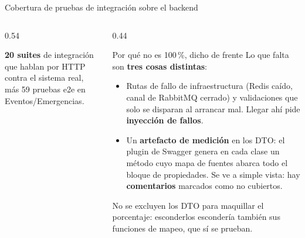 \documentclass[aspectratio=169,10pt,xcolor={table}]{beamer}
\begin{document}
\begin{frame}{Cobertura de pruebas de integración sobre el backend}
  \begin{columns}[T]
    \begin{column}{0.54\textwidth}
      \vspace{-0.3em}
      \scriptsize
      \textbf{20 suites} de integración que hablan por HTTP contra el sistema real, más 59
      pruebas e2e en Eventos/Emergencias.
    \end{column}
    \begin{column}{0.44\textwidth}
      \scriptsize
      \begin{alertblock}{Por qué no es 100\,\%, dicho de frente}
        Lo que falta son \textbf{tres cosas distintas}:
        \begin{itemize}
          \item Rutas de fallo de infraestructura (Redis caído, canal de RabbitMQ cerrado) y
                validaciones que solo se disparan al arrancar mal. Llegar ahí pide
                \textbf{inyección de fallos}.
          \item Un \textbf{artefacto de medición} en los DTO: el plugin de Swagger genera en cada
                clase un método cuyo mapa de fuentes abarca todo el bloque de propiedades. Se ve a
                simple vista: hay \textbf{comentarios} marcados como no cubiertos.
        \end{itemize}
        No se excluyen los DTO para maquillar el porcentaje: esconderlos escondería también sus
        funciones de mapeo, que sí se prueban.
      \end{alertblock}
    \end{column}
  \end{columns}
\end{frame}
\end{document}

